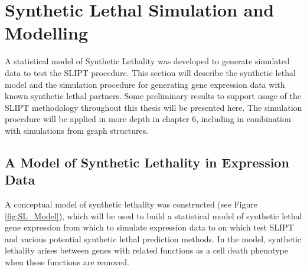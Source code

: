 

\FloatBarrier

\section{Synthetic Lethal Simulation and Modelling} \label{methods:simulation_SL_expression} 

A statistical model of Synthetic Lethality was developed to generate simulated data to test the SLIPT procedure. This section will describe the synthetic lethal model and the simulation procedure for generating gene expression data with known synthetic lethal partners. Some preliminary results to support usage of the SLIPT methodology throughout this thesis will be presented here. The simulation procedure will be applied in more depth in chapter 6, including in combination with simulations from graph structures.

\subsection{A Model of Synthetic Lethality in Expression Data} \label{methods:SL_Model}

A conceptual model of synthetic lethality was constructed (see Figure \ref{fig:SL_Model}), which will be used to build a statistical model of synthetic lethal gene expression from which to simulate expression data to on which test SLIPT and various potential synthetic lethal prediction methods. In the model, synthetic lethality arises between genes with related functions as a cell death phenotype when these functions are removed.

